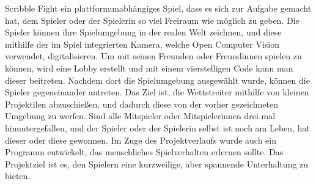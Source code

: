 Scribble Fight ein plattformunabhängiges Spiel, dass es sich zur Aufgabe gemacht hat, dem Spieler oder der Spielerin so viel Freiraum wie möglich zu geben.
Die Spieler können ihre Spielumgebung in der realen Welt zeichnen, und diese mithilfe der im Spiel integrierten Kamera, welche Open Computer Vision verwendet, digitalisieren.
Um mit seinen Freunden oder Freundinnen spielen zu können, wird eine Lobby erstellt und mit einem vierstelligen Code kann man dieser beitreten.
Nachdem dort die Spielumgebung ausgewählt wurde, können die Spieler gegeneinander antreten.
Das Ziel ist, die Wettstreiter mithilfe von kleinen Projektilen abzuschießen, und dadurch diese von der vorher gezeichneten Umgebung zu werfen.
Sind alle Mitspieler oder Mitspielerinnen drei mal hinuntergefallen, und der Spieler oder der Spielerin selbst ist noch am Leben, hat dieser oder diese gewonnen.
Im Zuge des Projektverlaufs wurde auch ein Programm entwickelt, das menschliches Spielverhalten erlernen sollte.
Das Projektziel ist es, den Spielern eine kurzweilige, aber spannende Unterhaltung zu bieten.
